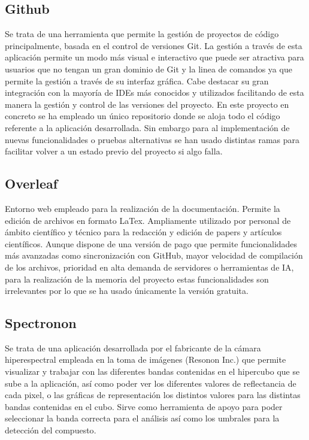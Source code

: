 \subsection{Github}
Se trata de una herramienta que permite la gestión de proyectos de código principalmente, basada en el control de versiones Git\cite{GitHub2025}. La gestión a través de esta aplicación permite un modo más visual e interactivo que puede ser atractiva para usuarios que no tengan un gran dominio de Git y la linea de comandos ya que permite  la gestión a través de su interfaz gráfica. Cabe destacar su gran integración con la mayoría de IDEs más conocidos y utilizados facilitando de esta manera la gestión y control de las versiones del proyecto.
En este proyecto en concreto se ha empleado un único repositorio donde se aloja todo el código referente a la aplicación desarrollada.  Sin embargo para al implementación de nuevas funcionalidades o pruebas alternativas se han usado distintas ramas para facilitar volver a un estado previo del proyecto si algo falla.


\subsection{Overleaf}
Entorno web empleado para la realización de la documentación\cite{Overleaf2025}. Permite la edición de archivos en formato LaTex. Ampliamente utilizado por personal de ámbito científico y técnico para la redacción y edición de papers y artículos científicos. Aunque dispone de una versión de pago que permite funcionalidades más avanzadas como sincronización con GitHub, mayor velocidad de compilación de los archivos, prioridad en alta demanda de servidores o herramientas de IA, para la realización de la memoria del proyecto estas funcionalidades son irrelevantes por lo que se ha usado únicamente la versión gratuita.

\subsection{Spectronon}

Se trata de una aplicación desarrollada por el fabricante de la cámara hiperespectral empleada en la toma de imágenes (Resonon Inc.)  que permite visualizar y trabajar con las diferentes bandas contenidas en el hipercubo que se sube a la aplicación, así como poder ver los diferentes valores de reflectancia de cada pixel, o las gráficas de representación los distintos valores para las distintas bandas contenidas en el cubo. Sirve como herramienta de apoyo para poder seleccionar la banda correcta para el análisis así como los umbrales para la detección del compuesto\cite{Resonon2025}.

